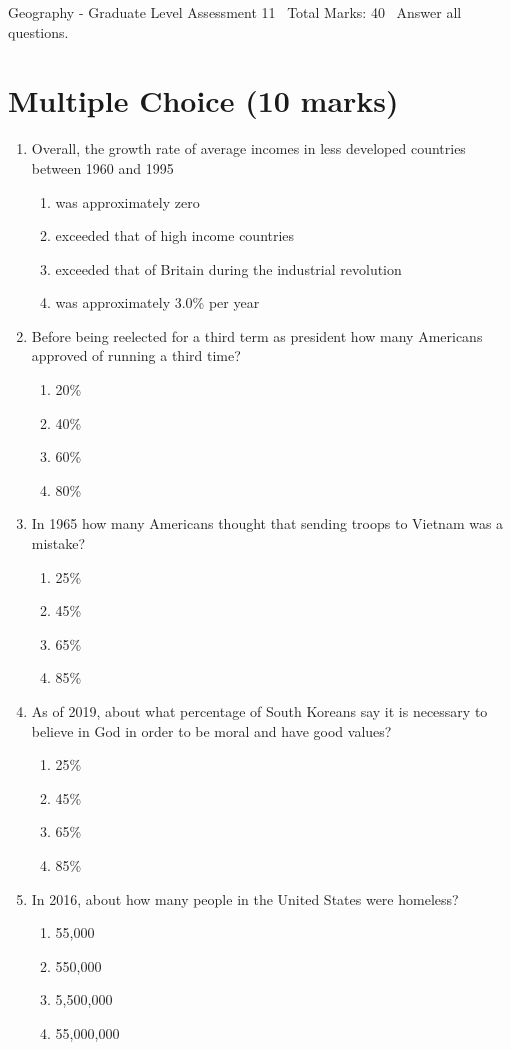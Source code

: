 \documentclass[12pt]{article}
\begin{document}
\begin{center}
Geography - Graduate Level Assessment 11 \
Total Marks: 40 \
Answer all questions.
\end{center}

\section*{Multiple Choice (10 marks)}
\begin{enumerate}[label=\arabic*.]
\item Overall, the growth rate of average incomes in less developed countries between 1960 and 1995
\begin{enumerate}[label=(\alph*)]
    \item was approximately zero
    \item exceeded that of high income countries
    \item exceeded that of Britain during the industrial revolution
    \item was approximately 3.0\% per year
\end{enumerate}
\item Before being reelected for a third term as president how many Americans approved of running a third time?
\begin{enumerate}[label=(\alph*)]
    \item 20\%
    \item 40\%
    \item 60\%
    \item 80\%
\end{enumerate}
\item In 1965 how many Americans thought that sending troops to Vietnam was a mistake?
\begin{enumerate}[label=(\alph*)]
    \item 25\%
    \item 45\%
    \item 65\%
    \item 85\%
\end{enumerate}
\item As of 2019, about what percentage of South Koreans say it is necessary to believe in God in order to be moral and have good values?
\begin{enumerate}[label=(\alph*)]
    \item 25\%
    \item 45\%
    \item 65\%
    \item 85\%
\end{enumerate}
\item In 2016, about how many people in the United States were homeless?
\begin{enumerate}[label=(\alph*)]
    \item 55,000
    \item 550,000
    \item 5,500,000
    \item 55,000,000
\end{enumerate}
\end{enumerate}
\end{document}
